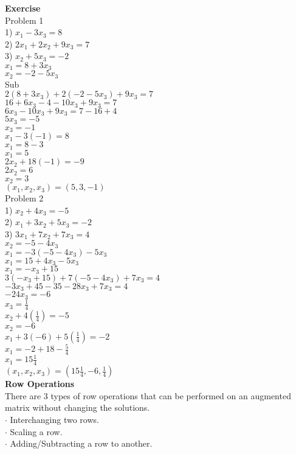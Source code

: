 \documentclass[]{article}
\begin{document}
\textbf{Exercise}\\
\textsf{Problem 1}\\
1) $x_1 - 3x_3 = 8$\\
2) $2x_1 + 2x_2 + 9x_3 = 7$\\
3) $x_2 + 5x_3 = -2$\\
$x_1 = 8 + 3x_3$\\
$x_2 = -2 - 5x_3$\\
Sub\\
$2(8 + 3x_3) + 2(-2 - 5x_3) + 9x_3 = 7$\\
$16 + 6x_3 -4 -10x_3 + 9x_3 = 7$\\
$6x_3 - 10x_3 + 9x_3 = 7 - 16 + 4$\\
$5x_3 = -5$\\
$x_3 = -1$\\
$x_1 - 3(-1) = 8$\\
$x_1 = 8 - 3$\\
$x_1 = 5$\\
$2x_2 + 18(-1) = -9$\\
$2x_2 = 6$\\
$x_2 = 3$\\
$(x_1, x_2, x_3) = (5, 3, -1)$\\
\textsf{Problem 2}\\
1) $x_2 + 4x_3 = -5$\\
2) $x_1 + 3x_2 + 5x_3 = -2$\\
3) $3x_1 + 7x_2 + 7x_3 = 4$\\
$x_2 = -5 - 4x_3$\\
$x_1 = -3(-5 - 4x_3) - 5x_3$\\
$x_1 = 15 + 4x_3 - 5x_3$\\
$x_1 = -x_3 + 15$\\
$3(-x_3 + 15) + 7(-5 - 4x_3) + 7x_3 = 4$\\
$-3x_3 + 45 - 35 - 28x_3 + 7x_3 = 4$\\
$-24x_3 = -6$\\
$x_3 = \frac{1}{4}$\\
$x_2 + 4(\frac{1}{4}) = -5$\\
$x_2 = -6$\\
$x_1 + 3(-6) + 5(\frac{1}{4}) = -2$\\
$x_1 = -2 + 18 - \frac{5}{4}$\\
$x_1 = 15\frac{1}{4}$\\
$(x_1, x_2, x_3) = (15\frac{1}{4}, -6, \frac{1}{4})$\\

\textbf{Row Operations}\\
There are 3 types of row operations that can be performed on an augmented matrix without changing the solutions.\\
$\cdot$ Interchanging two rows.\\
$\cdot$ Scaling a row.\\
$\cdot$ Adding/Subtracting a row to another.\\
\end{document}
